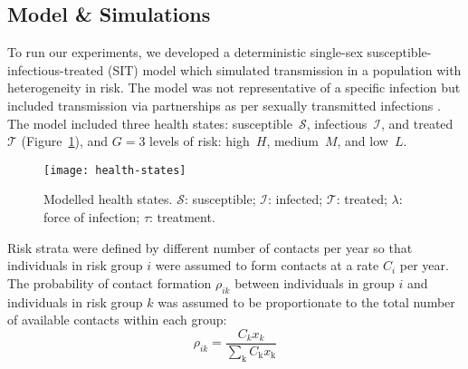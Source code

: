 \subsection{Model \& Simulations}\label{ss:model-sim}
To run our experiments,
we developed a deterministic single-sex susceptible-infectious-treated (SIT) model
which simulated transmission in a population with heterogeneity in risk.
The model was not representative of a specific infection
but included transmission via partnerships
as per sexually transmitted infections \citep{Garnett1994}.
The model included three health states:
susceptible~$\mathcal{S}$, infectious~$\mathcal{I}$, and treated~$\mathcal{T}$
(Figure~\ref{fig:health-states}),
and $G = 3$ levels of risk:
high~$H$, medium~$M$, and low~$L$.
\begin{figure}
  \centering
  \texttt{[image: health-states]}
  \caption{Modelled health states.
    $\mathcal{S}$: susceptible;
    $\mathcal{I}$: infected;
    $\mathcal{T}$: treated;
    $\lambda$: force of infection;
    $\tau$: treatment.}
  \label{fig:health-states}
\end{figure}
Risk strata were defined by different number of contacts per year
so that individuals in risk group $i$ were assumed to
form contacts at a rate $C_{i}$ per year.
The probability of contact formation $\rho_{ik}$ between individuals in group $i$
and individuals in risk group $k$ was assumed to be
proportionate to the total number of available contacts within each group:
\begin{equation}
\rho_{ik} = \frac
{C_k x_k}
{\sum_{\mathrm{k}}C_{\mathrm{k}} x_{\mathrm{k}}}
\label{eq:rho}
\end{equation}
